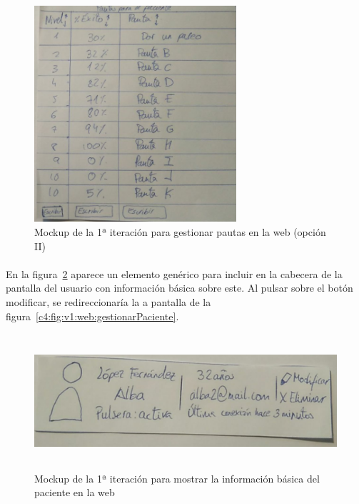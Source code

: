 \begin{figure}[H]
    \centering
    \includegraphics[width=0.7\linewidth, height=8cm]{Imagenes/04DescProblema/mockups/v1/web/04-pautasPaciente-2.png}
    \caption[Mockup de la 1ª iteración para gestionar pautas en la web (opción II)]{Mockup de la 1ª iteración para gestionar pautas en la web (opción II)}
    \label{c4:fig:v1:web:pautasPaciente2}
\end{figure}

\paragraph{}
En la figura~\ref{c4:fig:v1:web:infoPaciente} aparece un elemento genérico para incluir en la cabecera de la pantalla del usuario con información básica sobre este. Al pulsar sobre el botón modificar, se redireccionaría la a pantalla de la figura~\ref{c4:fig:v1:web:gestionarPaciente}.

\begin{figure}[H]
    \centering
    \includegraphics[width=0.7\linewidth, height=5cm]{Imagenes/04DescProblema/mockups/v1/web/07-informacionBasicaPaciente.jpg}
    \caption[Mockup de la 1ª iteración para mostrar la información básica del paciente en la web]{Mockup de la 1ª iteración para mostrar la información básica del paciente en la web}
    \label{c4:fig:v1:web:infoPaciente}
\end{figure}


